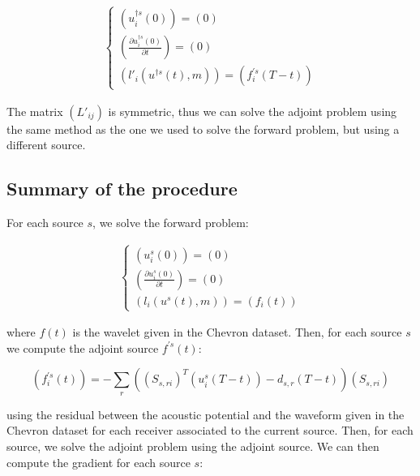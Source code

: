 \documentclass{article}
\begin{document}
\begin{align}
	\begin{cases}
		\left(u_i^{\dagger s} (0) \right) = \left( 0 \right) \\
		\left( \frac{\partial u_i^{\dagger s} (0)}{\partial t} \right) = \left( 0 \right) \\
		\left( l'_i (u^{\dagger s} (t), m) \right) = \left( f_i^{\prime s} (T - t) \right)
	\end{cases}
\end{align}

The matrix $\left( L'_{ij} \right)$ is symmetric, thus we can solve the adjoint problem using the same method as the one we used to solve the forward problem, but using a different source.

\subsection{Summary of the procedure}

For each source $s$, we solve the forward problem:

\begin{align}
	\begin{cases}
		\left(u_i^s (0)\right) = \left( 0 \right) \\
		\left( \frac{\partial u_i^s (0)}{\partial t} \right) = \left( 0 \right) \\
		\left( l_i (u^s (t), m) \right) = \left( f_i (t) \right)
	\end{cases}
\end{align}

where $f (t)$ is the wavelet given in the Chevron dataset. Then, for each source $s$ we compute the adjoint source $f^{\prime s} (t)$:

\begin{equation}
	\left( f_i^{\prime s} (t) \right) = - \sum_r \left( \left( S_{s, r i} \right) ^{T} \left( u_i^s (T - t) \right) - d_{s, r} (T - t) \right) \left( S_{s, r i} \right)
\end{equation}

using the residual between the acoustic potential and the waveform given in the Chevron dataset for each receiver associated to the current source. Then, for each source, we solve the adjoint problem using the adjoint source. We can then compute the gradient for each source $s$:
\end{document}
